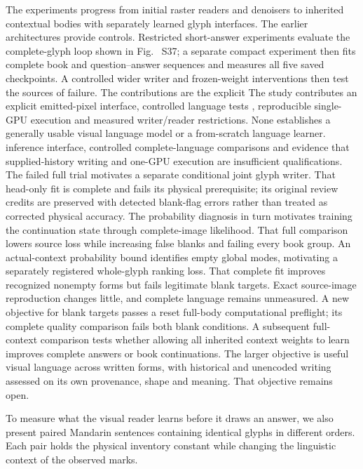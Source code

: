 \documentclass[12pt,a4paper]{article}
\providecommand{\DIFadd}[1]{{\protect\color{blue} \sf #1}} %
\providecommand{\DIFdel}[1]{{\protect\color{red} \scriptsize #1}} %
\providecommand{\DIFaddbegin}{} %
\providecommand{\DIFaddend}{} %
\providecommand{\DIFdelbegin}{} %
\providecommand{\DIFdelend}{} %
\begin{document}
\DIFdelbegin \DIFdel{The experiments progress from initial raster readers and denoisers to inherited contextual bodies with separately learned glyph interfaces. The
earlier architectures provide controls. Restricted short-answer experiments evaluate the complete-glyph loop shown in Fig. ~S37; a separate compact
experiment then fits complete book and question--answer sequences and measures
all five saved checkpoints.
A controlled wider writer and frozen-weight
interventions then test the sources of failure.
The contributions are the explicit }\DIFdelend \DIFaddbegin \DIFadd{The study contributes an explicit }\DIFaddend emitted-pixel \DIFdelbegin \DIFdel{interface, controlled language tests , reproducible
single-GPU execution and measured writer/reader restrictions. None establishes a generally
usable visual language model or a from-scratch language learner. }\DIFdelend \DIFaddbegin \DIFadd{inference interface, controlled
complete-language comparisons and evidence that supplied-history writing and
one-GPU execution are insufficient qualifications. The failed full trial
motivates a separate conditional joint glyph writer. That head-only fit is
complete and fails its physical prerequisite; its original review credits
are preserved with detected blank-flag errors rather than treated as corrected
physical accuracy. The probability diagnosis in turn motivates training the
continuation state through complete-image likelihood. That full comparison
lowers source loss while increasing false blanks and failing every book group.
An actual-context probability bound identifies empty global modes, motivating
a separately registered whole-glyph ranking loss. That complete fit improves
recognized nonempty forms but fails legitimate blank targets. Exact source-image
reproduction changes little, and complete language remains unmeasured. A new
objective for blank targets passes a reset full-body computational preflight;
its complete quality comparison fails both blank conditions. A subsequent
full-context comparison tests whether allowing all inherited context weights to learn improves complete answers or book continuations.
The larger objective is useful
visual language across written forms, with historical and unencoded writing
assessed on its own provenance, shape and meaning. That objective remains open.
}\DIFaddend

\DIFaddbegin \DIFadd{To measure what the visual reader learns before it draws an answer, we also
present paired Mandarin sentences containing identical glyphs in different
orders. Each pair holds the physical inventory constant while changing the
linguistic context of the observed marks.
}
\end{document}

